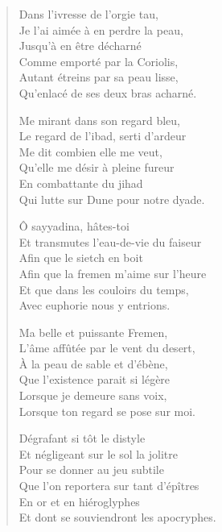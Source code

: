 \begin{verse}
Dans l’ivresse de l’orgie tau,\\
Je l’ai aimée à en perdre la peau,\\
Jusqu’à en être décharné\\
Comme emporté par la Coriolis,\\
Autant étreins par sa peau lisse,\\
Qu’enlacé de ses deux bras acharné.

Me mirant dans son regard bleu,\\
Le regard de l’ibad, serti d’ardeur\\
Me dit combien elle me veut,\\
Qu’elle me désir à pleine fureur\\
En combattante du jihad\\
Qui lutte sur Dune pour notre dyade.

Ô sayyadina, hâtes-toi\\
Et transmutes l’eau-de-vie du faiseur\\
Afin que le sietch en boit\\
Afin que la fremen m’aime sur l’heure\\
Et que dans les couloirs du temps,\\
Avec euphorie nous y entrions.

Ma belle et puissante Fremen,\\
L’âme affûtée par le vent du desert,\\
À la peau de sable et d’ébène,\\
Que l’existence parait si légère\\
Lorsque je demeure sans voix,\\
Lorsque ton regard se pose sur moi.

Dégrafant si tôt le distyle\\
Et négligeant sur le sol la jolitre\\
Pour se donner au jeu subtile\\
Que l’on reportera sur tant d’épîtres\\
En or et en hiéroglyphes\\
Et dont se souviendront les apocryphes.


\end{verse}
